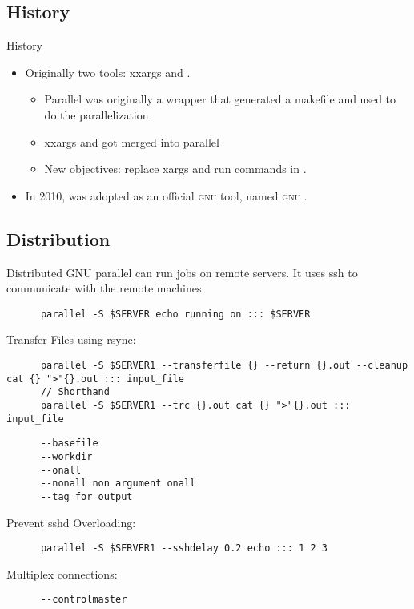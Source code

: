 \subsection{History}
\begin{frame}{History}
   \begin{itemize}[<+(1)->]
      \itemsep10pt
      \item Originally two tools: xxargs and \LogoParallel. \begin{itemize}
         \itemsep5pt
         \item Parallel was originally a wrapper that generated a makefile and used  to do the parallelization
         \item xxargs and \LogoParallel got merged into parallel
         \item New objectives: replace xargs and run commands in \LogoParallel. 
      \end{itemize}
      \item In 2010, \LogoParallel was adopted as an official \textsc{gnu} tool, named \textsc{gnu} \LogoParallel.
   \end{itemize}
\end{frame}


\subsection{Distribution}
\begin{frame}[fragile]{Distributed}
   GNU parallel can run jobs on remote servers. It uses ssh to communicate with the remote machines.\\
   \begin{verbatim}
      parallel -S $SERVER echo running on ::: $SERVER
   \end{verbatim}
   Transfer Files using rsync:
   \begin{verbatim}
      parallel -S $SERVER1 --transferfile {} --return {}.out --cleanup cat {} ">"{}.out ::: input_file
      // Shorthand
      parallel -S $SERVER1 --trc {}.out cat {} ">"{}.out ::: input_file
   \end{verbatim}
   \begin{verbatim}
      --basefile
      --workdir
      --onall
      --nonall non argument onall
      --tag for output
   \end{verbatim}
   Prevent sshd Overloading:
   \begin{verbatim}
      parallel -S $SERVER1 --sshdelay 0.2 echo ::: 1 2 3
   \end{verbatim}
   Multiplex connections:
   \begin{verbatim}
      --controlmaster
   \end{verbatim}


\end{frame}
